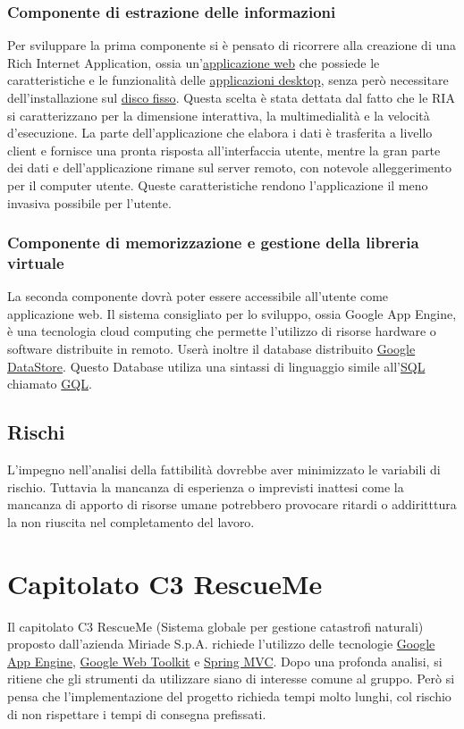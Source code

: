 \subsection{Componente di estrazione delle informazioni}
Per sviluppare la prima componente si \`e pensato di ricorrere alla creazione di
una Rich Internet Application, ossia un'\underline{applicazione web} che possiede le
caratteristiche e le funzionalit\`a delle \underline{applicazioni desktop}, senza
per\`o necessitare dell'installazione sul \underline{disco fisso}. Questa scelta
\`e stata dettata dal fatto che le RIA si caratterizzano per la dimensione interattiva, la multimedialit\`a e la velocit\`a d'esecuzione.
La parte dell'applicazione che elabora i dati \`e trasferita a livello client e
fornisce una pronta risposta all'interfaccia utente, mentre la gran parte dei dati e dell'applicazione 
rimane sul server remoto, con notevole alleggerimento per il computer utente. 
Queste caratteristiche rendono l'applicazione il meno invasiva possibile per
l'utente.

\subsection{Componente di memorizzazione e gestione della libreria virtuale}
La seconda componente dovr\`a poter essere accessibile all'utente come
applicazione web. Il sistema consigliato per lo sviluppo, ossia Google App Engine, 
\`e una tecnologia cloud computing che permette l'utilizzo di risorse hardware o
 software distribuite in remoto. User\`a inoltre il database distribuito
 \underline{Google DataStore}. Questo Database utiliza una sintassi di
 linguaggio simile all'\underline{SQL} chiamato \underline{GQL}.

\section{Rischi}
L'impegno nell'analisi della fattibilit\`a dovrebbe aver minimizzato le variabili di rischio.
Tuttavia la mancanza di esperienza o imprevisti inattesi come la mancanza di apporto di risorse umane potrebbero provocare ritardi o addiritttura la non riuscita nel completamento del lavoro.

\chapter{Capitolato C3 RescueMe}
\thispagestyle{fancy}
Il capitolato C3 RescueMe (Sistema globale per gestione catastrofi naturali)
proposto dall'azienda Miriade S.p.A. richiede l'utilizzo delle tecnologie
\underline{Google App Engine}, \underline{Google Web Toolkit} e
\underline{Spring MVC}. Dopo una profonda analisi, si ritiene che gli strumenti
da utilizzare siano di interesse comune al gruppo. Per\`o si pensa che l'implementazione del progetto richieda tempi molto lunghi, col rischio di non rispettare i tempi di consegna prefissati.

